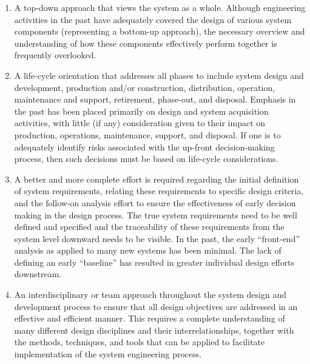 \begin{enumerate}
	\item A top-down approach that views the system as a whole. Although engineering activities in the past have adequately covered the design of various system components (representing a bottom-up approach), the necessary overview and understanding of how these components effectively perform together is frequently overlooked.
	\item A life-cycle orientation that addresses all phases to include system design and development, production and/or construction, distribution, operation, maintenance and support, retirement, phase-out, and disposal. Emphasis in the past has been placed primarily on design and system acquisition activities, with little (if any) consideration given to their impact on production, operations, maintenance, support, and disposal. If one is to adequately identify risks associated with the up-front decision-making process, then such decisions must be based on life-cycle considerations.
	\item A better and more complete effort is required regarding the initial definition of system requirements, relating these requirements to specific design criteria, and the follow-on analysis effort to ensure the effectiveness of early decision making in the design process. The true system requirements need to be well defined and specified and the traceability of these requirements from the system level downward needs to be visible. In the past, the early “front-end” analysis as applied to many new systems has been minimal. The lack of defining an early “baseline” has resulted in greater individual design efforts downstream.
	\item An interdisciplinary or team approach throughout the system design and development process to ensure that all design objectives are addressed in an effective and efficient manner. This requires a complete understanding of many different design disciplines and their interrelationships, together with the methods, techniques, and tools that can be applied to facilitate implementation of the system engineering process.
\end{enumerate}

